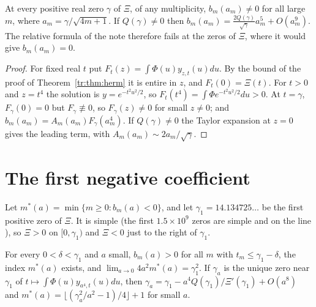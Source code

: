 \begin{proposition}\label{tr:prop:zeros}
At every positive real zero $\gamma$ of $\Xi$, of any multiplicity, $b_m(a_m)\ne0$ for all large $m$, where $a_m=\gamma/\sqrt{4m+1}$. If $Q(\gamma)\ne0$ then $b_m(a_m)=\frac{2Q(\gamma)}{\sqrt\gamma}a_m^5+O(a_m^9)$. The relative formula of the note therefore fails at the zeros of $\Xi$, where it would give $b_m(a_m)=0$.
\end{proposition}

\begin{proof}
For fixed real $t$ put $F_t(z)=\int\Phi(u)y_{z,t}(u)du$. By the bound of the proof of Theorem~\ref{tr:thm:herm} it is entire in $z$, and $F_t(0)=\Xi(t)$. For $t>0$ and $z=t^4$ the solution is $y=e^{-t^2u^2/2}$, so $F_t(t^4)=\int\Phi e^{-t^2u^2/2}du>0$. At $t=\gamma$, $F_\gamma(0)=0$ but $F_\gamma\not\equiv0$, so $F_\gamma(z)\ne0$ for small $z\ne0$; and $b_m(a_m)=A_m(a_m)F_\gamma(a_m^4)$. If $Q(\gamma)\ne0$ the Taylor expansion at $z=0$ gives the leading term, with $A_m(a_m)\sim2a_m/\sqrt\gamma$.
\end{proof}

\section{The first negative coefficient}\label{tr:sec:first}

Let $m^*(a)=\min\{m\ge0:b_m(a)<0\}$, and let $\gamma_1=14.134725\ldots$ be the first positive zero of $\Xi$. It is simple (the first $1.5\times10^9$ zeros are simple and on the line \cite{LRW86}), so $\Xi>0$ on $[0,\gamma_1)$ and $\Xi<0$ just to the right of $\gamma_1$.

\begin{corollary}\label{tr:cor:first}
For every $0<\delta<\gamma_1$ and $a$ small, $b_m(a)>0$ for all $m$ with $t_m\le\gamma_1-\delta$, the index $m^*(a)$ exists, and $\lim_{a\to0}4a^2m^*(a)=\gamma_1^2$. If $\gamma_a$ is the unique zero near $\gamma_1$ of $t\mapsto\int\Phi(u)y_{a^4,t}(u)du$, then $\gamma_a=\gamma_1-a^4Q(\gamma_1)/\Xi'(\gamma_1)+O(a^8)$ and $m^*(a)=\big\lfloor(\gamma_a^2/a^2-1)/4\big\rfloor+1$ for small $a$.
\end{corollary}

